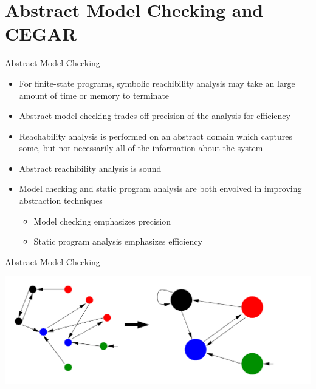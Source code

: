 
\section{Abstract Model Checking and CEGAR}

\begin{frame}{Abstract Model Checking}
\begin{itemize}
  \itemsep1em
  
  \item For finite-state programs, symbolic reachibility analysis may take
  an large amount of time or memory to terminate
  
  \item Abstract model checking trades off precision of the analysis for
  efficiency
  
  \item Reachability analysis is performed on an abstract domain which
  captures some, but not necessarily all of the information about the system
  
  \item Abstract reachibility analysis is sound
  
  \item Model checking and static program analysis are both envolved in
  improving abstraction techniques \\
    \begin{itemize}
      \itemsep 0.3cm
      \item Model checking emphasizes precision
      \item Static program analysis emphasizes efficiency
    \end{itemize}   
\end{itemize}
\end{frame}


\begin{frame}{Abstract Model Checking}

\includegraphics[width=\textwidth]{content/chapter_model_checking/software_model_checking/img/abstract.png}

\end{frame}

